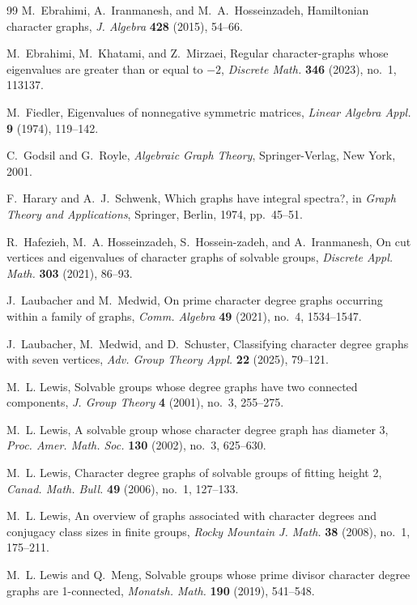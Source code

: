 \documentclass[11pt]{amsart}
\begin{document}
\begin{thebibliography}{99}
M.~Ebrahimi, A.~Iranmanesh, and M.~A.~Hosseinzadeh, 
Hamiltonian character graphs, 
\textit{J. Algebra} \textbf{428} (2015), 54--66.

M.~Ebrahimi, M.~Khatami, and Z.~Mirzaei, 
Regular character-graphs whose eigenvalues are greater than or equal to $-2$, 
\textit{Discrete Math.} \textbf{346} (2023), no.~1, 113137.

M.~Fiedler, 
Eigenvalues of nonnegative symmetric matrices, 
\textit{Linear Algebra Appl.} \textbf{9} (1974), 119--142.

C.~Godsil and G.~Royle, 
\textit{Algebraic Graph Theory}, 
Springer-Verlag, New York, 2001.

F.~Harary and A.~J.~Schwenk, 
Which graphs have integral spectra?, 
in \textit{Graph Theory and Applications}, 
Springer, Berlin, 1974, pp.~45--51.

R.~Hafezieh, M.~A. Hosseinzadeh, S.~Hossein-zadeh, and A.~Iranmanesh, 
On cut vertices and eigenvalues of character graphs of solvable groups, 
\textit{Discrete Appl. Math.} \textbf{303} (2021), 86--93.

J.~Laubacher and M.~Medwid, 
On prime character degree graphs occurring within a family of graphs, 
\textit{Comm. Algebra} \textbf{49} (2021), no.~4, 1534--1547.

J.~Laubacher, M.~Medwid, and D.~Schuster,
Classifying character degree graphs with seven vertices,
\textit{Adv. Group Theory Appl.} \textbf{22} (2025), 79--121.

M.~L. Lewis,  
Solvable groups whose degree graphs have two connected components,  
\textit{J. Group Theory} \textbf{4} (2001), no.~3, 255--275.

M.~L. Lewis,  
A solvable group whose character degree graph has diameter 3, 
\textit{Proc. Amer. Math. Soc.} \textbf{130} (2002), no.~3, 625--630.

M.~L. Lewis, 
Character degree graphs of solvable groups of fitting height 2, 
\textit{Canad. Math. Bull.} \textbf{49} (2006), no.~1, 127--133.

M.~L. Lewis, 
An overview of graphs associated with character degrees and conjugacy class sizes in finite groups, 
\textit{Rocky Mountain J. Math.} \textbf{38} (2008), no.~1, 175--211.

M.~L. Lewis and Q.~Meng, 
Solvable groups whose prime divisor character degree graphs are 1-connected, 
\textit{Monatsh. Math.} \textbf{190} (2019), 541--548.


\end{thebibliography}
\end{document}
